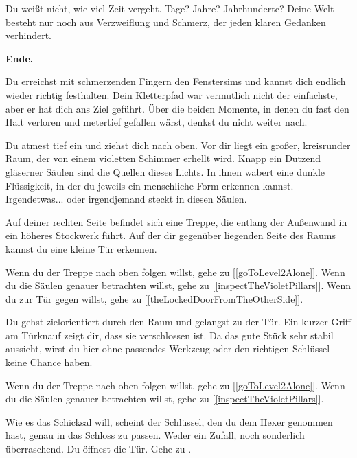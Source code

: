 Du weißt nicht, wie viel Zeit vergeht. Tage? Jahre? Jahrhunderte? Deine Welt besteht nur noch aus Verzweiflung und Schmerz, der jeden klaren Gedanken verhindert.

\textbf{Ende.}


Du erreichst mit schmerzenden Fingern den Fenstersims und kannst dich endlich wieder richtig festhalten. Dein Kletterpfad war vermutlich nicht der einfachste, aber er hat dich ans Ziel geführt. Über die beiden Momente, in denen du fast den Halt verloren und metertief gefallen wärst, denkst du nicht weiter nach.

Du atmest tief ein und ziehst dich nach oben. Vor dir liegt ein großer, kreisrunder Raum, der von einem violetten Schimmer erhellt wird. Knapp ein Dutzend gläserner Säulen sind die Quellen dieses Lichts. In ihnen wabert eine dunkle Flüssigkeit, in der du jeweils ein menschliche Form erkennen kannst. Irgendetwas... oder irgendjemand steckt in diesen Säulen.

Auf deiner rechten Seite befindet sich eine Treppe, die entlang der Außenwand in ein höheres Stockwerk führt. Auf der dir gegenüber liegenden Seite des Raums kannst du eine kleine Tür erkennen.

Wenn du der Treppe nach oben folgen willst, gehe zu [\ref{goToLevel2Alone}].
Wenn du die Säulen genauer betrachten willst, gehe zu [\ref{inspectTheVioletPillars}].
Wenn du zur Tür gegen willst, gehe zu [\ref{theLockedDoorFromTheOtherSide}].


Du gehst zielorientiert durch den Raum und gelangst zu der Tür. Ein kurzer Griff am Türknauf zeigt dir, dass sie verschlossen ist. Da das gute Stück sehr stabil aussieht, wirst du hier ohne passendes Werkzeug oder den richtigen Schlüssel keine Chance haben.

Wenn du der Treppe nach oben folgen willst, gehe zu [\ref{goToLevel2Alone}].
Wenn du die Säulen genauer betrachten willst, gehe zu [\ref{inspectTheVioletPillars}].


Wie es das Schicksal will, scheint der Schlüssel, den du dem Hexer genommen hast, genau in das Schloss zu passen. Weder ein Zufall, noch sonderlich überraschend. Du öffnest die Tür. Gehe zu .

